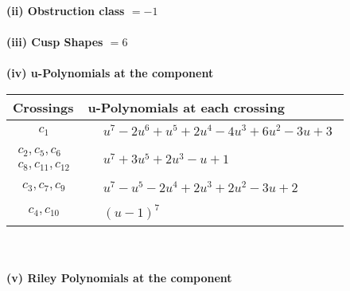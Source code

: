 \documentclass[1p]{elsarticle_modified}
\theoremstyle{definition}
\begin{document}
\flushleft \textbf{(ii) Obstruction class $= -1$}\\~\\
\flushleft \textbf{(iii) Cusp Shapes $= 6$}\\~\\
\newpage\renewcommand{\arraystretch}{1}
\flushleft \textbf{(iv) u-Polynomials at the component}\newline \\
\begin{tabular}{m{50pt}|m{274pt}}
Crossings & \hspace{64pt}u-Polynomials at each crossing \\
\hline $$\begin{aligned}c_{1}\end{aligned}$$&$\begin{aligned}
&u^7-2 u^6+u^5+2 u^4-4 u^3+6 u^2-3 u+3
\end{aligned}$\\
\hline $$\begin{aligned}c_{2},c_{5},c_{6}\\c_{8},c_{11},c_{12}\end{aligned}$$&$\begin{aligned}
&u^7+3 u^5+2 u^3- u+1
\end{aligned}$\\
\hline $$\begin{aligned}c_{3},c_{7},c_{9}\end{aligned}$$&$\begin{aligned}
&u^7- u^5-2 u^4+2 u^3+2 u^2-3 u+2
\end{aligned}$\\
\hline $$\begin{aligned}c_{4},c_{10}\end{aligned}$$&$\begin{aligned}
&(u-1)^7
\end{aligned}$\\
\hline
\end{tabular}\\~\\
\newpage\renewcommand{\arraystretch}{1}
\flushleft \textbf{(v) Riley Polynomials at the component}\newline \\
\end{document}
